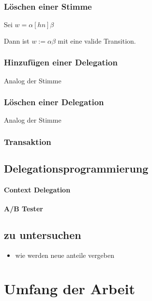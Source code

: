\documentclass[]{article}
\begin{document}
\subsubsection*{Löschen einer Stimme}

Sei $w=\alpha [hn]\beta$

Dann ist $w:=\alpha\beta$ mit eine valide Transition.

\subsubsection*{Hinzufügen einer Delegation}
Analog der Stimme

\subsubsection*{Löschen einer Delegation}
Analog der Stimme

\subsubsection*{Transaktion} %

\subsection{Delegationsprogrammierung}

\paragraph{Context Delegation}
\paragraph{A/B Tester}

\subsection{zu untersuchen}

\begin{itemize}
\itemsep1pt\parskip0pt
\item
  wie werden neue anteile vergeben
\end{itemize}


\section{Umfang der Arbeit}
\end{document}
